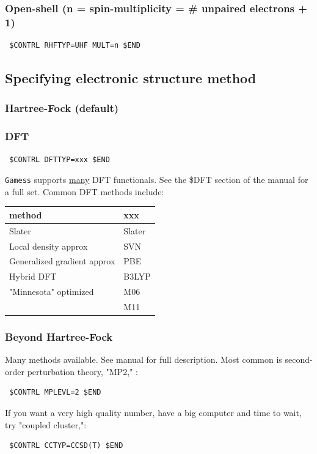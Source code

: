 \documentclass[11pt]{article}
\begin{document}
\subsubsection{Open-shell (n = spin-multiplicity = \# unpaired electrons + 1)}
\label{sec-7-1-2}
\begin{verbatim}
 $CONTRL RHFTYP=UHF MULT=n $END
\end{verbatim}
\subsection{Specifying electronic structure method}
\label{sec-7-2}
\subsubsection{Hartree-Fock (default)}
\label{sec-7-2-1}
\subsubsection{DFT}
\label{sec-7-2-2}
\begin{verbatim}
 $CONTRL DFTTYP=xxx $END
\end{verbatim}
\texttt{Gamess} supports \uline{many} DFT functionals.  See the \$DFT section of the manual for a full set.  Common DFT methods include:
\begin{center}
\begin{tabular}{ll}
\hline
method & xxx\\
\hline
Slater & Slater\\
Local density approx & SVN\\
Generalized gradient approx & PBE\\
Hybrid DFT & B3LYP\\
"Minnesota" optimized & M06\\
 & M11\\
\hline
\end{tabular}
\end{center}
\subsubsection{Beyond Hartree-Fock}
\label{sec-7-2-3}
Many methods available.  See manual for full description.  Most common is second-order perturbation theory, "MP2," :
\begin{verbatim}
 $CONTRL MPLEVL=2 $END
\end{verbatim}

If you want a very high quality number, have a big computer and time to wait, try "coupled cluster,":
\begin{verbatim}
 $CONTRL CCTYP=CCSD(T) $END
\end{verbatim}
\end{document}
